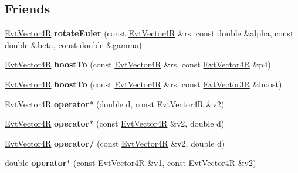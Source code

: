 \subsection*{Friends}
\begin{DoxyCompactItemize}
\item 
\hypertarget{class_evt_vector4_r_ae2877e270d32ce2120a7777c0dca8e7d}{}\hyperlink{class_evt_vector4_r}{Evt\+Vector4\+R} {\bfseries rotate\+Euler} (const \hyperlink{class_evt_vector4_r}{Evt\+Vector4\+R} \&rs, const double \&alpha, const double \&beta, const double \&gamma)\label{class_evt_vector4_r_ae2877e270d32ce2120a7777c0dca8e7d}

\item 
\hypertarget{class_evt_vector4_r_a0b13c98d05c790cb066cfa6bcef8616d}{}\hyperlink{class_evt_vector4_r}{Evt\+Vector4\+R} {\bfseries boost\+To} (const \hyperlink{class_evt_vector4_r}{Evt\+Vector4\+R} \&rs, const \hyperlink{class_evt_vector4_r}{Evt\+Vector4\+R} \&p4)\label{class_evt_vector4_r_a0b13c98d05c790cb066cfa6bcef8616d}

\item 
\hypertarget{class_evt_vector4_r_ab05e24f7782bae4e7ff030a638312e5a}{}\hyperlink{class_evt_vector4_r}{Evt\+Vector4\+R} {\bfseries boost\+To} (const \hyperlink{class_evt_vector4_r}{Evt\+Vector4\+R} \&rs, const \hyperlink{class_evt_vector3_r}{Evt\+Vector3\+R} \&boost)\label{class_evt_vector4_r_ab05e24f7782bae4e7ff030a638312e5a}

\item 
\hypertarget{class_evt_vector4_r_acc03536ce87c0a91c66958d790856ff8}{}\hyperlink{class_evt_vector4_r}{Evt\+Vector4\+R} {\bfseries operator$\ast$} (double d, const \hyperlink{class_evt_vector4_r}{Evt\+Vector4\+R} \&v2)\label{class_evt_vector4_r_acc03536ce87c0a91c66958d790856ff8}

\item 
\hypertarget{class_evt_vector4_r_a204120f4372eb0125e067bde3f7321e5}{}\hyperlink{class_evt_vector4_r}{Evt\+Vector4\+R} {\bfseries operator$\ast$} (const \hyperlink{class_evt_vector4_r}{Evt\+Vector4\+R} \&v2, double d)\label{class_evt_vector4_r_a204120f4372eb0125e067bde3f7321e5}

\item 
\hypertarget{class_evt_vector4_r_ac737fc3d41df34a7520762bc50ac1952}{}\hyperlink{class_evt_vector4_r}{Evt\+Vector4\+R} {\bfseries operator/} (const \hyperlink{class_evt_vector4_r}{Evt\+Vector4\+R} \&v2, double d)\label{class_evt_vector4_r_ac737fc3d41df34a7520762bc50ac1952}

\item 
\hypertarget{class_evt_vector4_r_ae2196a15ca1dcbb797cedcb1b45ecbdf}{}double {\bfseries operator$\ast$} (const \hyperlink{class_evt_vector4_r}{Evt\+Vector4\+R} \&v1, const \hyperlink{class_evt_vector4_r}{Evt\+Vector4\+R} \&v2)\label{class_evt_vector4_r_ae2196a15ca1dcbb797cedcb1b45ecbdf}


\end{DoxyCompactItemize}
